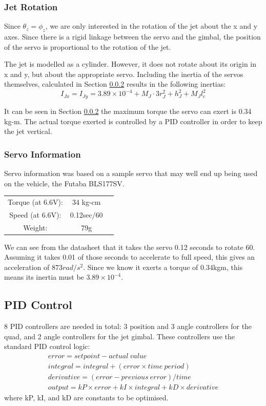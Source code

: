 \documentclass[11pt]{article}
\begin{document}
\subsubsection{Jet Rotation}
Since $\theta_z = \phi_z$, we are only interested in the rotation of the jet about the x and y axes. Since there is a rigid linkage between the servo and the gimbal, the position of the servo is proportional to the rotation of the jet.

The jet is modelled as a cylinder. However, it does not rotate about its origin in x and y, but about the appropriate servo. Including the inertia of the servos themselves, calculated in Section \ref{servo_info} results in the following inertias:
\begin{equation}
    I_{Jx} = I_{Jy} = 3.89\times10^{-4} + M_J\cdot3r_J^2 + h_J^2 + M_Jl_c^2
\end{equation}

It can be seen in Section \ref{servo_info} the maximum torque the servo can exert is 0.34 kg-m. The actual torque exerted is controlled by a PID controller in order to keep the jet vertical.

\subsubsection{Servo Information}  \label{servo_info}
Servo information was based on a sample servo that may well end up being used on the vehicle, the Futaba BLS177SV.

\begin{center}
\begin{tabular}{ccc}
    Torque (at 6.6V): & 34 kg-cm \\
    Speed (at 6.6V): & 0.12sec/60\textdegree{} \\
    Weight: & 79g \\
\end{tabular}
\end{center}

We can see from the datasheet that it takes the servo 0.12 seconds to rotate 60\textdegree{}. Assuming it takes 0.01 of those seconds to accelerate to full speed, this gives an acceleration of $873rad/s^2$. Since we know it exerts a torque of 0.34kgm, this means its inertia must be $3.89\times10^{-4}$.

\subsection{PID Control} \label{sec:PID_Control}
8 PID controllers are needed in total: 3 position and 3 angle controllers for the quad, and 2 angle controllers for the jet gimbal. These controllers use the standard PID control logic:
\begin{eqnarray*}
    error = setpoint - actual\ value \\
    integral = integral + (error \times time\ period) \\
    derivative = (error - previous\ error)/time \\
    output = kP \times error + kI \times integral + kD \times derivative
\end{eqnarray*}
where kP, kI, and kD are constants to be optimised.
\end{document}
